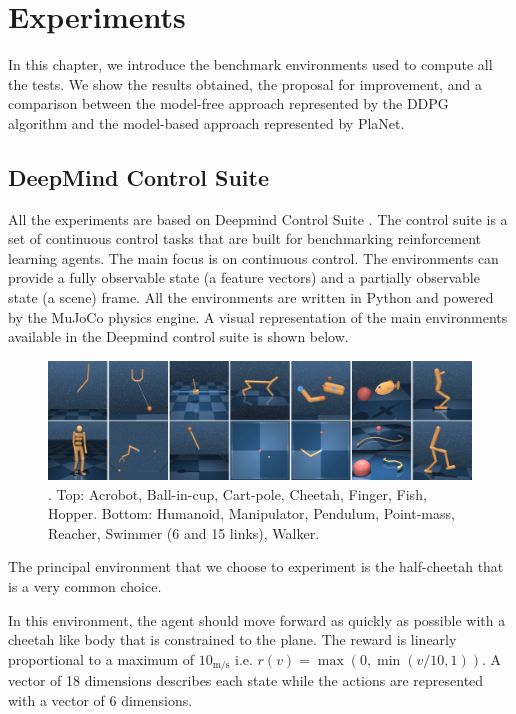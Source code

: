 
\chapter{Experiments} %

\label{Chapter6} %
In this chapter, we introduce the benchmark environments used to compute all the tests. We show the results obtained, the proposal for improvement, and a comparison between the model-free approach represented by the DDPG algorithm and the model-based approach represented by PlaNet.

\section{DeepMind Control Suite}
All the experiments are based on Deepmind Control Suite \cite{tassa2018deepmind}.
The control suite is a set of continuous control tasks that are built for benchmarking reinforcement learning agents. The main focus is on continuous control. The environments can provide a fully observable state (a feature vectors) and a partially observable state (a scene) frame. All the environments are written in Python and powered by the MuJoCo physics engine. A visual representation of the main environments available in the Deepmind control suite is shown below.


\begin{figure}[h]
\centering
\includegraphics[width=1.0\textwidth]{pictures/dm_control}
                  \caption{. Top: Acrobot, Ball-in-cup, Cart-pole, Cheetah, Finger, Fish, Hopper.
Bottom: Humanoid, Manipulator, Pendulum, Point-mass, Reacher, Swimmer (6 and 15 links), Walker.}
            \end{figure}
The principal environment that we choose to experiment is the half-cheetah that is a very common choice. 

In this environment, the agent should move forward as quickly as possible with a cheetah like body that is constrained to the plane. The reward is linearly proportional to a maximum of $10_{\mathrm{m} / \mathrm{s}}$ i.e. $r(v)=\max (0, \min (v / 10,1))$.
A vector of 18 dimensions describes each state while the actions are represented with a vector of 6 dimensions.

